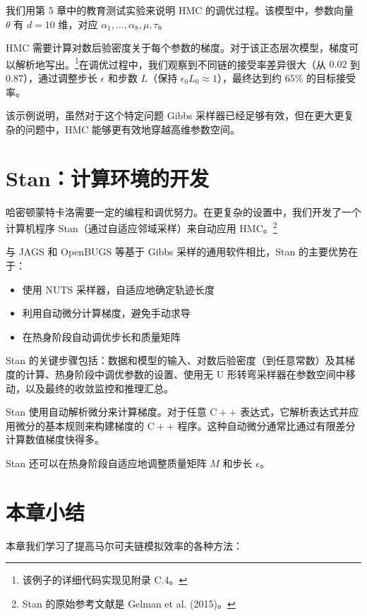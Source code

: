 我们用第 5 章中的教育测试实验来说明 HMC 的调优过程。该模型中，参数向量 $\theta$ 有 $d = 10$ 维，对应 $\alpha_1, \ldots, \alpha_8, \mu, \tau$。

HMC 需要计算对数后验密度关于每个参数的梯度。对于该正态层次模型，梯度可以解析地写出。\footnote{该例子的详细代码实现见附录 C.4。}在调优过程中，我们观察到不同链的接受率差异很大（从 $0.02$ 到 $0.87$），通过调整步长 $\epsilon$ 和步数 $L$（保持 $\epsilon_0 L_0 \approx 1$），最终达到约 $65\%$ 的目标接受率。

该示例说明，虽然对于这个特定问题 Gibbs 采样器已经足够有效，但在更大更复杂的问题中，HMC 能够更有效地穿越高维参数空间。

\section{Stan：计算环境的开发}

哈密顿蒙特卡洛需要一定的编程和调优努力。在更复杂的设置中，我们开发了一个计算机程序 Stan（通过自适应邻域采样）来自动应用 HMC。\footnote{Stan 的原始参考文献是 Gelman et al. (2015)。}

与 JAGS 和 OpenBUGS 等基于 Gibbs 采样的通用软件相比，Stan 的主要优势在于：
\begin{itemize}
  \item 使用 NUTS 采样器，自适应地确定轨迹长度
  \item 利用自动微分计算梯度，避免手动求导
  \item 在热身阶段自动调优步长和质量矩阵
\end{itemize}

Stan 的关键步骤包括：数据和模型的输入、对数后验密度（到任意常数）及其梯度的计算、热身阶段中调优参数的设置、使用无 U 形转弯采样器在参数空间中移动，以及最终的收敛监控和推理汇总。

Stan 使用自动解析微分来计算梯度。对于任意 $\mathrm{C}++$ 表达式，它解析表达式并应用微分的基本规则来构建梯度的 $\mathrm{C}++$ 程序。这种自动微分通常比通过有限差分计算数值梯度快得多。

Stan 还可以在热身阶段自适应地调整质量矩阵 $M$ 和步长 $\epsilon$。

\section{本章小结}

本章我们学习了提高马尔可夫链模拟效率的各种方法：

